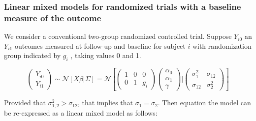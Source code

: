 \documentclass[final, paper=letter,5p,times,twocolumn]{elsarticle}
\theoremstyle{definition}
\begin{document}
\subsubsection{Linear mixed models for randomized trials with a baseline measure of the outcome}

We consider a conventional two-group randomized controlled trial. Suppose $Y_{i0}$ an $Y_{i1}$ outcomes measured at follow-up and baseline for subject $i$ with randomization group indicated by $g_{i}$ , taking values 0 and 1.

\begin{equation*}
  \left(
  \begin{array}{c}
    Y_{i0} \\
    Y_{i1}
  \end{array}
  \right) \sim \mathcal{N} \left[ X\beta | \Sigma \right]= \mathcal{N} \left[
    \left(
    \begin{array}{ccc}
      1 & 0 & 0 \\
      0 & 1 & g_{i}
    \end{array}
    \right)
    \left(
    \begin{array}{c}
      \alpha_{0} \\
      \alpha_{1} \\
      \gamma
    \end{array}
    \right) |
    \left(
    \begin{array}{cc}
      \sigma_{1}^{2} & \sigma_{12} \\
      \sigma_{12}   & \sigma_{2}^{2}
    \end{array}
    \right)
  \right]
\end{equation*}

Provided that $\sigma_{1,2}^{2} > \sigma_{12}$, that implies that $\sigma_{1} = \sigma_{2}$. Then equation the model can be re-expressed as a linear mixed model as follows:
\end{document}

